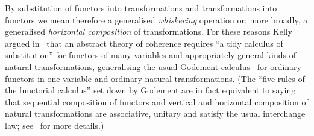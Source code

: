 By substitution of functors into transformations and transformations into functors we mean therefore a generalised \emph{whiskering} operation or, more broadly, a generalised \emph{horizontal composition} of transformations. For these reasons Kelly argued in~\cite{kelly_many-variable_1972} that an abstract theory of coherence requires ``a tidy calculus of substitution'' for functors of many variables and appropriately general kinds of natural transformations, generalising the usual Godement calculus~\cite[Appendice]{godement_topologie_1958} for ordinary functors in one variable and ordinary natural transformations. (The ``five rules of the functorial calculus'' set down by Godement are in fact equivalent to saying that sequential composition of functors and vertical and horizontal composition of natural transformations are associative, unitary and satisfy the usual interchange law; see~\cite[Introduction]{santamaria_towards_2019} for more details.)


